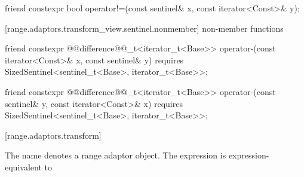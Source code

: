 %
\begin{itemdecl}
friend constexpr bool operator!=(const sentinel& x, const iterator<Const>& y);
\end{itemdecl}

\begin{itemdescr}
\pnum
\oldtxt{\returns} 
\end{itemdescr}

[range.adaptors.transform_view.sentinel.nonmember]{ non-member functions}

%
\begin{itemdecl}
friend constexpr @@difference@@_t<iterator_t<Base>>
operator-(const iterator<Const>& x, const sentinel& y)
  requires SizedSentinel<sentinel_t<Base>, iterator_t<Base>>;
\end{itemdecl}

\begin{itemdescr}
\pnum
\oldtxt{\returns} 
\end{itemdescr}

%
\begin{itemdecl}
friend constexpr @@difference@@_t<iterator_t<Base>>
operator-(const sentinel& y, const iterator<Const>& x)
  requires SizedSentinel<sentinel_t<Base>, iterator_t<Base>>;
\end{itemdecl}

\begin{itemdescr}
\pnum
\oldtxt{\returns} 
\end{itemdescr}

[range.adaptors.transform]{}

\pnum
The name  denotes a range adaptor
object.  The expression   is expression-equivalent to
 


